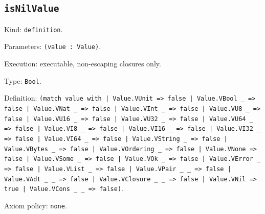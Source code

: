 \documentclass[11pt]{article}
\begin{document}
\subsection*{\texttt{isNilValue}}
\noindent Kind: \texttt{definition}.\par
\noindent Parameters: \texttt{(value : Value)}.\par
\noindent Execution: executable, non-escaping closures only.\par
\noindent Type: \texttt{Bool}.\par
\noindent Definition: \texttt{(match value with | Value.VUnit => false | Value.VBool \_ => false | Value.VNat \_ => false | Value.VInt \_ => false | Value.VU8 \_ => false | Value.VU16 \_ => false | Value.VU32 \_ => false | Value.VU64 \_ => false | Value.VI8 \_ => false | Value.VI16 \_ => false | Value.VI32 \_ => false | Value.VI64 \_ => false | Value.VString \_ => false | Value.VBytes \_ => false | Value.VOrdering \_ => false | Value.VNone => false | Value.VSome \_ => false | Value.VOk \_ => false | Value.VError \_ => false | Value.VList \_ => false | Value.VPair \_ \_ => false | Value.VAdt \_ \_ => false | Value.VClosure \_ \_ => false | Value.VNil => true | Value.VCons \_ \_ => false)}.\par
\noindent Axiom policy: \texttt{none}.\par
\end{document}
